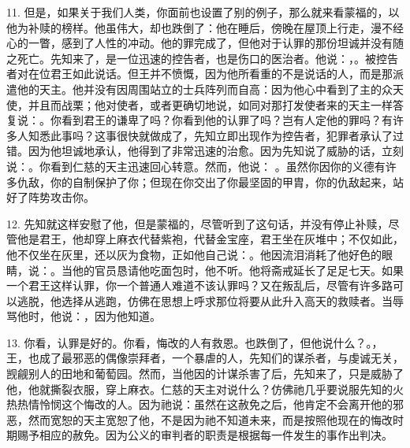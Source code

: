 11. 但是，如果关于我们人类，你面前也设置了别的例子，那么就来看蒙福的，以他为补赎的榜样。他虽伟大，却也跌倒了：他在睡后，傍晚在屋顶上行走，漫不经心的一瞥，感到了人性的冲动。他的罪完成了，但他对于认罪的那份坦诚并没有随之死亡。先知来了，是一位迅速的控告者，也是伤口的医治者。他说：，。被控告者对在位君王如此说话。但王并不愤慨，因为他所看重的不是说话的人，而是那派遣他的天主。他并没有因周围站立的士兵阵列而自高：因为他心中看到了主的众天使，并且而战栗；他对使者，或者更确切地说，如同对那打发使者来的天主一样答复说：。你看到君王的谦卑了吗？你看到他的认罪了吗？岂有人定他的罪吗？有许多人知悉此事吗？这事很快就做成了，先知立即出现作为控告者，犯罪者承认了过错。因为他坦诚地承认，他得到了非常迅速的治愈。因为先知说了威胁的话，立刻说：。你看到仁慈的天主迅速回心转意。然而，他说： 。虽然你因你的义德有许多仇敌，你的自制保护了你；但现在你交出了你最坚固的甲胄，你的仇敌起来，站好了阵势攻击你。\par

12. 先知就这样安慰了他，但是蒙福的，尽管听到了这句话，并没有停止补赎，尽管他是君王，他却穿上麻衣代替紫袍，代替金宝座，君王坐在灰堆中；不仅如此，他不仅坐在灰里，还以灰为食物，正如他自己说：。他因流泪消耗了他好色的眼睛，说：。当他的官员恳请他吃面包时，他不听。他将斋戒延长了足足七天。如果一个君王这样认罪，你一个普通人难道不该认罪吗？又在叛乱后，尽管有许多路可以逃脱，他选择从逃跑，仿佛在思想上呼求那位将要从此升入高天的救赎者。当辱骂他时，他说：，因为他知道。\par

13. 你看，认罪是好的。你看，悔改的人有救恩。也跌倒了，但他说什么？。，王，也成了最邪恶的偶像崇拜者，一个暴虐的人，先知们的谋杀者，与虔诚无关，觊觎别人的田地和葡萄园。然而，当他因的计谋杀害了后，先知来了，只是威胁了他，他就撕裂衣服，穿上麻衣。仁慈的天主对说什么？仿佛祂几乎要说服先知的火热热情怜悯这个悔改的人。因为祂说：虽然在这赦免之后，他肯定不会离开他的邪恶，然而宽恕的天主宽恕了他，不是因为祂不知道未来，而是按照他现在的悔改时期赐予相应的赦免。因为公义的审判者的职责是根据每一件发生的事作出判决。\par

